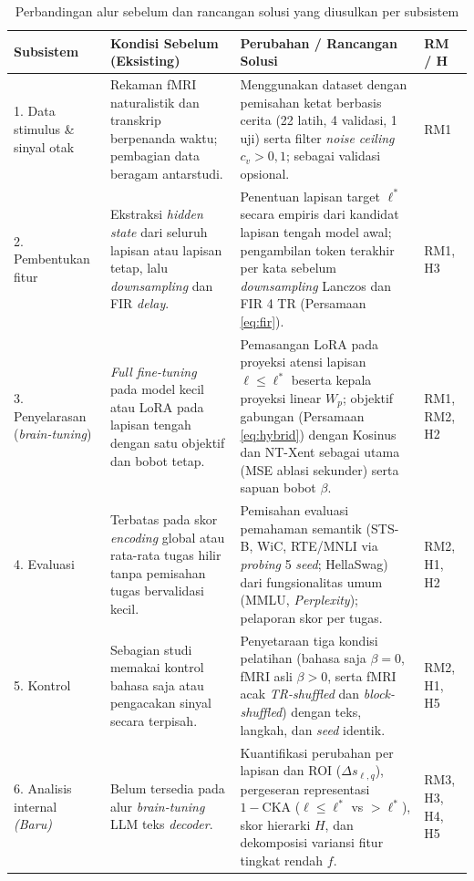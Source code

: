 \begin{table}[h]
  \centering
  \caption{Perbandingan alur sebelum dan rancangan solusi yang diusulkan per subsistem}
  \label{tab:ds_perbandingan_subsistem}
  \small
  \begin{tabularx}{\textwidth}{p{2.5cm} | p{3.7cm} | p{4.6cm} | X}
    \hline
    \textbf{Subsistem} & \textbf{Kondisi Sebelum (Eksisting)} & \textbf{Perubahan / Rancangan Solusi} & \textbf{RM / H} \\
    \hline
    1. Data stimulus \& sinyal otak & Rekaman fMRI naturalistik dan transkrip berpenanda waktu; pembagian data beragam antarstudi. & Menggunakan dataset \textcite{lebel2023natural} dengan pemisahan ketat berbasis cerita (22 latih, 4 validasi, 1 uji) serta filter \textit{noise ceiling} $c_v > 0{,}1$; \textcite{nastase2021narratives} sebagai validasi opsional. & RM1 \\
    \hline
    2. Pembentukan fitur & Ekstraksi \textit{hidden state} dari seluruh lapisan atau lapisan tetap, lalu \textit{downsampling} dan FIR \textit{delay}. & Penentuan lapisan target $\ell^*$ secara empiris dari kandidat lapisan tengah model awal; pengambilan token terakhir per kata sebelum \textit{downsampling} Lanczos dan FIR 4 TR (Persamaan \ref{eq:fir}). & RM1, H3 \\
    \hline
    3. Penyelarasan (\textit{brain-tuning}) & \textit{Full fine-tuning} pada model kecil atau LoRA pada lapisan tengah dengan satu objektif dan bobot tetap. & Pemasangan LoRA pada proyeksi atensi lapisan $\ell \le \ell^*$ beserta kepala proyeksi linear $W_p$; objektif gabungan (Persamaan \ref{eq:hybrid}) dengan Kosinus dan NT-Xent sebagai utama (MSE ablasi sekunder) serta sapuan bobot $\beta$. & RM1, RM2, H2 \\
    \hline
    4. Evaluasi & Terbatas pada skor \textit{encoding} global atau rata-rata tugas hilir tanpa pemisahan tugas bervalidasi kecil. & Pemisahan evaluasi pemahaman semantik (STS-B, WiC, RTE/MNLI via \textit{probing} 5 \textit{seed}; HellaSwag) dari fungsionalitas umum (MMLU, \textit{Perplexity}); pelaporan skor per tugas. & RM2, H1, H2 \\
    \hline
    5. Kontrol & Sebagian studi memakai kontrol bahasa saja atau pengacakan sinyal secara terpisah. & Penyetaraan tiga kondisi pelatihan (bahasa saja $\beta=0$, fMRI asli $\beta>0$, serta fMRI acak \textit{TR-shuffled} dan \textit{block-shuffled}) dengan teks, langkah, dan \textit{seed} identik. & RM2, H1, H5 \\
    \hline
    6. Analisis internal \textit{(Baru)} & Belum tersedia pada alur \textit{brain-tuning} LLM teks \textit{decoder}. & Kuantifikasi perubahan per lapisan dan ROI ($\Delta s_{\ell,q}$), pergeseran representasi $1-\text{CKA}$ ($\ell \le \ell^*$ vs $> \ell^*$), skor hierarki $H$, dan dekomposisi variansi fitur tingkat rendah $f$. & RM3, H3, H4, H5 \\
    \hline
  \end{tabularx}
\end{table}

